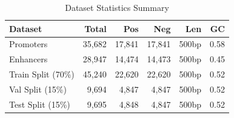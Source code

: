 \begin{table}[h]
\centering
\caption{Dataset Statistics Summary}
\begin{tabular}{lrrrrr}
\hline
\textbf{Dataset} & \textbf{Total} & \textbf{Pos} & \textbf{Neg} & \textbf{Len} & \textbf{GC} \\ \hline
Promoters & 35,682 & 17,841 & 17,841 & 500bp & 0.58 \\
Enhancers & 28,947 & 14,474 & 14,473 & 500bp & 0.45 \\ \hline
Train Split (70\%) & 45,240 & 22,620 & 22,620 & 500bp & 0.52 \\
Val Split (15\%) & 9,694 & 4,847 & 4,847 & 500bp & 0.52 \\
Test Split (15\%) & 9,695 & 4,848 & 4,847 & 500bp & 0.52 \\ \hline
\end{tabular}
\end{table}
